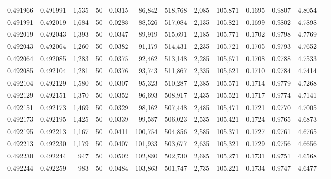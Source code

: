 \begin{tabular}{rrrrrrrrrrrrr}
0.491966 & 0.491991 & 1,535 &  50 &                                     0.0315 &  86,842 & 518,768 &   2,085 & 105,871 & 0.1695 & 0.9807 & 4.8054 \\
0.491991 & 0.492019 & 1,684 &  50 &                                     0.0288 &  88,526 & 517,084 &   2,135 & 105,821 & 0.1699 & 0.9802 & 4.7898 \\
0.492019 & 0.492043 & 1,393 &  50 &                                     0.0347 &  89,919 & 515,691 &   2,185 & 105,771 & 0.1702 & 0.9798 & 4.7769 \\
0.492043 & 0.492064 & 1,260 &  50 &                                     0.0382 &  91,179 & 514,431 &   2,235 & 105,721 & 0.1705 & 0.9793 & 4.7652 \\
0.492064 & 0.492085 & 1,283 &  50 &                                     0.0375 &  92,462 & 513,148 &   2,285 & 105,671 & 0.1708 & 0.9788 & 4.7533 \\
0.492085 & 0.492104 & 1,281 &  50 &                                     0.0376 &  93,743 & 511,867 &   2,335 & 105,621 & 0.1710 & 0.9784 & 4.7414 \\
0.492104 & 0.492129 & 1,580 &  50 &                                     0.0307 &  95,323 & 510,287 &   2,385 & 105,571 & 0.1714 & 0.9779 & 4.7268 \\
0.492129 & 0.492151 & 1,370 &  50 &                                     0.0352 &  96,693 & 508,917 &   2,435 & 105,521 & 0.1717 & 0.9774 & 4.7141 \\
0.492151 & 0.492173 & 1,469 &  50 &                                     0.0329 &  98,162 & 507,448 &   2,485 & 105,471 & 0.1721 & 0.9770 & 4.7005 \\
0.492173 & 0.492195 & 1,425 &  50 &                                     0.0339 &  99,587 & 506,023 &   2,535 & 105,421 & 0.1724 & 0.9765 & 4.6873 \\
0.492195 & 0.492213 & 1,167 &  50 &                                     0.0411 & 100,754 & 504,856 &   2,585 & 105,371 & 0.1727 & 0.9761 & 4.6765 \\
0.492213 & 0.492230 & 1,179 &  50 &                                     0.0407 & 101,933 & 503,677 &   2,635 & 105,321 & 0.1729 & 0.9756 & 4.6656 \\
0.492230 & 0.492244 &   947 &  50 &                                     0.0502 & 102,880 & 502,730 &   2,685 & 105,271 & 0.1731 & 0.9751 & 4.6568 \\
0.492244 & 0.492259 &   983 &  50 &                                     0.0484 & 103,863 & 501,747 &   2,735 & 105,221 & 0.1734 & 0.9747 & 4.6477 \\

\end{tabular}
